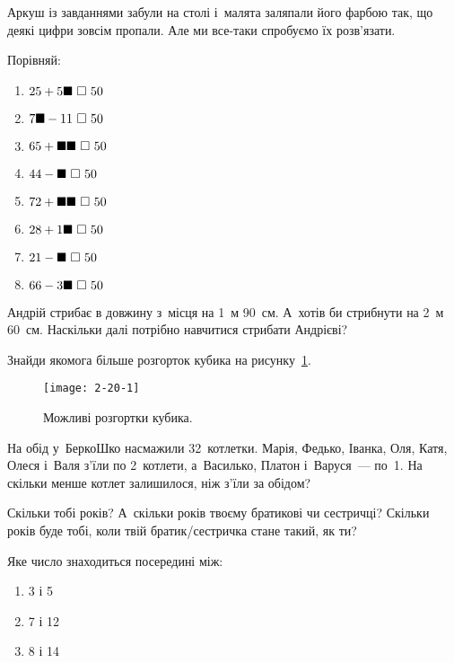 \problem
Аркуш із завданнями забули на столі і~малята заляпали його фарбою так,
що деякі цифри зовсім пропали.
Але ми все-таки спробуємо їх розв’язати.

Порівняй:
\begin{multicols}{2}
  \begin{enumerate}
    \item $25 + 5\hiddendigit \ \square \ 50$
    \item $7\hiddendigit - 11 \ \square \ 50$
    \item $65 + \hiddendigit\hiddendigit \ \square \ 50$
    \item $44 - \hiddendigit \ \square \ 50$
    \item $72 + \hiddendigit\hiddendigit \ \square \ 50$
    \item $28 + 1\hiddendigit \ \square \ 50$
    \item $21 - \hiddendigit \ \square \ 50$
    \item $66 - 3\hiddendigit \ \square \ 50$
  \end{enumerate}
\end{multicols}


\problem
Андрій стрибає в довжину з~місця на 1~м 90~см.
А~хотів би стрибнути на 2~м 60~см.
Наскільки далі потрібно навчитися стрибати Андрієві?


\problem
Знайди якомога більше розгорток кубика на рисунку~\ref{fig:cubes}.

\begin{figure}[ht]
  \centering
  \texttt{[image: 2-20-1]}
  \caption{Можливі розгортки кубика.}
  \label{fig:cubes}
\end{figure}


\problem
На обід у~БеркоШко насмажили 32~котлетки.
Марія, Федько, Іванка, Оля, Катя, Олеся і~Валя з’їли по 2~котлети,
а~Василько, Платон і~Варуся~--- по~1.
На скільки менше котлет залишилося, ніж з’їли за обідом?


\problem
Скільки тобі років?
А~скільки років твоєму братикові чи сестричці?
Скільки років буде тобі, коли твій братик/сестричка стане такий, як ти?


\problem
Яке число знаходиться посередині між:
\begin{multicols}{3}
  \begin{enumerate}
    \item 3 і 5
    \item 7 і 12
    \item 8 і 14
  \end{enumerate}
\end{multicols}


